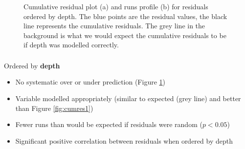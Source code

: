 \begin{frame}[fragile]
\begin{figure}[h!]
  \centering
{}
    \caption{Cumulative residual plot (a) and runs profile (b) for residuals ordered by depth. The blue points are the residual values, the black line represents the cumulative residuals. The grey line in the background is what we would expect the cumulative residuals to be if depth was modelled correctly.}
  \label{fig:geeruns1}
\end{figure}
\end{frame}

\begin{frame}[fragile]
\frametitle{}
Ordered by \textbf{depth}
\begin{itemize}
\item No systematic over or under prediction (Figure \ref{fig:geeruns1})
\item Variable modelled appropriately (similar to expected (grey line) and better than Figure \ref{fig:cumres1})
\item Fewer runs than would be expected if residuals were random ($p<0.05$)
\item Significant positive correlation between residuals when ordered by depth
\end{itemize}
\end{frame}

